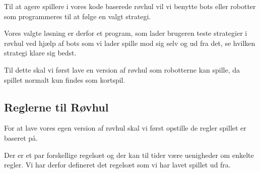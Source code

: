 \documentclass[a4paper, 12pt]{article}
\begin{document}
\begin{multicols}{2}
Til at agere spillere i vores kode baserede røvhul vil vi benytte bots eller robotter som programmeres til at følge en valgt strategi.

Vores valgte løsning er derfor et program, som lader brugeren teste strategier i røvhul ved hjælp af bots som vi lader spille mod sig selv og ud fra det, se hvilken strategi klare sig bedst.

Til dette skal vi først lave en version af røvhul som robotterne kan spille, da spillet normalt kun findes som kortspil. 

\subsection{Reglerne til Røvhul}
For at lave vores egen version af røvhul skal vi først opstille de regler spillet er baseret på.

Der er et par forskellige regelsæt og der kan til tider være uenigheder om enkelte regler. Vi har derfor defineret det regelsæt som vi har lavet spillet ud fra.


\end{multicols}
\end{document}
